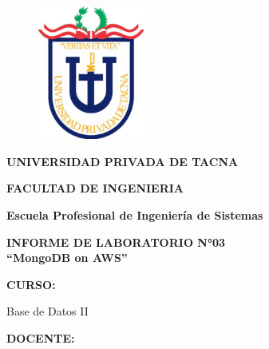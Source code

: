 \documentclass[12pt,letterpaper]{article}
\begin{document}
	\begin{titlepage}
		\begin{center}
			\begin{figure}[htb]
				\begin{center}
					\includegraphics[width=3.5cm]{./img/upt}
				\end{center}
			\end{figure}
			\vspace*{0.15in}
			\begin{Large}
				\textbf{UNIVERSIDAD PRIVADA DE TACNA}\\
			\end{Large}
			\vspace*{0.15in}
			\begin{Large}
				\textbf{FACULTAD DE INGENIERIA} \\
			\end{Large}
			\vspace*{0.1in}
			\begin{Large}
				\textbf{Escuela Profesional de Ingeniería de Sistemas} \\
			\end{Large}
			\vspace*{0.3in}
			\begin{Large}
				\textbf{INFORME DE LABORATORIO N°03}\\
				\textbf{“MongoDB on AWS”}\\
			\end{Large}
			\vspace*{0.2in}
			\begin{Large}
				\textbf{CURSO:} \\
			\end{Large}
			\vspace*{0.1in}
			\begin{large}
				Base de Datos II\\
			\end{large}
			\vspace*{0.2in}
			\begin{Large}
				\textbf{DOCENTE:} \\

\end{Large}
\end{center}
\end{titlepage}
\end{document}
